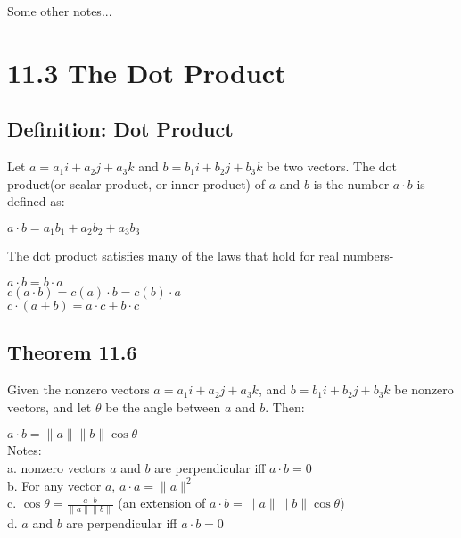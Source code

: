 \documentclass{article} %
\begin{document}
    Some other notes...
    
    \section*{11.3 The Dot Product}
    \subsection*{Definition: Dot Product}
    Let $a = a_1i+a_2j+a_3k$ and $b = b_1i+b_2j+b_3k$ be two vectors. The dot product(or scalar product, or inner product) of $a$ and $b$
    is the number $a \cdot b$ is defined as:
    \begin{center}
        $a \cdot b = a_1b_1+a_2b_2+a_3b_3$
        
    \end{center}
    The dot product satisfies many of the laws that hold for real numbers-\\
    \begin{center}
    
    $a \cdot b = b \cdot a$\\
    $c(a \cdot b) = c(a) \cdot b= c(b) \cdot a$\\
    $c \cdot (a+b)  = a \cdot c + b \cdot c$
    
    
        
    \end{center}
    
    \subsection*{Theorem 11.6}
    Given the nonzero vectors $a = a_1i+a_2j+a_3k$, and $b = b_1i+b_2j+b_3k$ be nonzero vectors, and let $\theta$ be the angle between 
    $a$ and $b$. Then:

    \begin{center}
        $a\cdot b = \|a\| \|b\| \cos \theta$\\
        Notes:\\
        a. nonzero vectors $a$ and $b$ are perpendicular iff $a \cdot b =0$\\
        b. For any vector $a$, $a \cdot a = \|a\|^2$\\
        c. $\cos \theta = \frac{a\cdot b}{\|a\|\|b\|}$ (an extension of $a\cdot b = \|a\| \|b\| \cos \theta$)\\
        d. $a$ and $b$ are perpendicular iff $a \cdot b = 0$
        
        
            
    \end{center}
   
\end{document}
